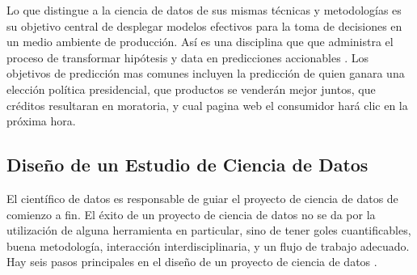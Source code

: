 Lo que distingue a la ciencia de datos de sus mismas técnicas y metodologías es su objetivo central de desplegar modelos efectivos para la toma de decisiones en un medio ambiente de producción. Así es una disciplina que que administra el proceso de transformar hipótesis y data en predicciones accionables \cite{zumelMount}. Los objetivos de predicción mas comunes incluyen la predicción de quien ganara una elección política presidencial, que productos se venderán mejor juntos, que créditos resultaran en moratoria, y cual pagina web el consumidor hará clic en la próxima hora. 

\subsection{Diseño de un Estudio de Ciencia de Datos}
El científico de datos es responsable de guiar el proyecto de ciencia de datos de comienzo a fin. El éxito de un proyecto de ciencia de datos no se da por la utilización de alguna herramienta en particular, sino de tener goles cuantificables, buena metodología, interacción interdisciplinaria, y un flujo de trabajo adecuado. Hay seis pasos principales en el diseño de un proyecto de ciencia de datos \cite{zumelMount}.

